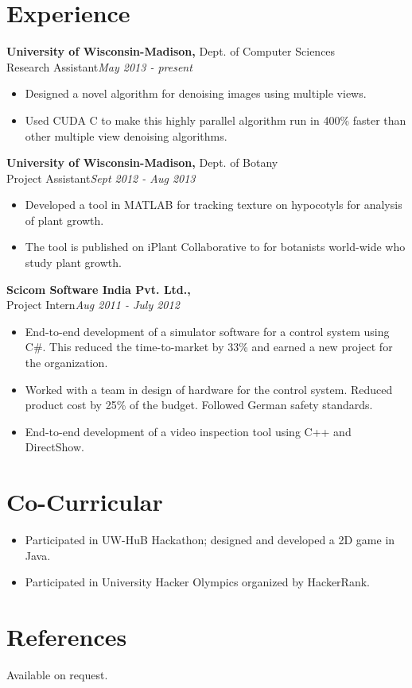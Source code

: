 \documentclass[margin]{res}
\begin{document}
\begin{resume}
\section{Experience}
 {\bf University of Wisconsin-Madison,} Dept. of Computer Sciences \\
Research Assistant\hfill {\it May 2013 - present}
 \begin{itemize} \itemsep -2pt  %
 \item Designed a novel algorithm for denoising images using multiple views.
 \item Used CUDA C to make this highly parallel algorithm run in 400\% faster than other multiple view denoising algorithms. 
 \end{itemize}

  {\bf University of Wisconsin-Madison,} Dept. of Botany \\
Project Assistant\hfill {\it Sept 2012 - Aug 2013}
 \begin{itemize} \itemsep -2pt  %
 \item Developed a tool in MATLAB for tracking texture on hypocotyls for analysis of plant growth.
 \item The tool is published on iPlant Collaborative to for botanists world-wide who study plant growth.
 \end{itemize}
  {\bf Scicom Software India Pvt. Ltd.,} \\
Project Intern\hfill{\it Aug 2011 - July 2012}
 \begin{itemize} \itemsep -2pt  %
 \item End-to-end development of a simulator software for a control system using C\#. This reduced the time-to-market by 33\% and earned a new project for the organization.
 \item Worked with a team in design of hardware for the control system. Reduced product cost by 25\% of the budget. Followed German safety standards. 
 \item End-to-end development of a video inspection tool using C++ and DirectShow.
 \end{itemize}

\section{Co-Curricular}
\begin{itemize} \itemsep -2pt  %
 \item Participated in UW-HuB Hackathon; designed and developed a 2D game in Java.
 \item Participated in University Hacker Olympics organized by HackerRank.
 \end{itemize}

 \section{References}
Available on request.


\end{resume} 
\end{document}
